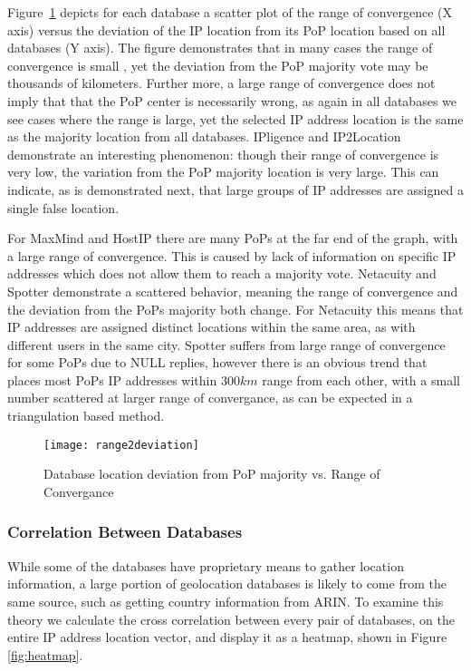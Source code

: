 Figure~\ref{fig:range2deviation} depicts for each database a scatter
plot of the range of convergence (X axis) versus the deviation of
the IP location from its PoP location based on all databases (Y
axis). The figure demonstrates that in many cases the range of
convergence is small , yet the deviation from the PoP majority vote
may be thousands of kilometers. Further more, a large range of
convergence does not imply that that the PoP center is necessarily
wrong, as again in all databases we see cases where the range is
large, yet the selected IP address location is the same as the
majority location from all databases. IPligence and IP2Location
demonstrate an interesting phenomenon: though their range of
convergence is very low, the variation from the PoP majority
location is very large. This can indicate, as is demonstrated next,
that large groups of IP addresses are assigned a single false
location.


For MaxMind and HostIP there are many PoPs at the far end of the
graph, with a large range of convergence. This is caused by lack of
information on specific IP addresses which does not allow them to
reach a majority vote. Netacuity and Spotter demonstrate a scattered
behavior, meaning the range of convergence and the deviation from
the PoPs majority both change. For Netacuity this means that IP
addresses are assigned distinct locations within the same area, as
with different users in the same city. Spotter suffers from large
range of convergence for some PoPs due to NULL replies, however
there is an obvious trend that places most PoPs IP addresses within
$300km$ range from each other, with a small number scattered at
larger range of convergance, as can be expected in a triangulation
based method.

\begin{figure}
\begin{minipage}[b]{\linewidth}
\centering
\texttt{[image: range2deviation]}
\caption{Database location deviation from PoP majority vs. Range of
Convergance} \label{fig:range2deviation}
\end{minipage}
\end{figure}

\subsubsection{Correlation Between Databases}

While some of the databases have proprietary means to gather
location information, a large portion of geolocation databases is
likely to come from the same source, such as getting country
information from ARIN. To examine this theory we calculate the cross
correlation between every pair of databases, on the entire IP
address location vector, and display it as a heatmap, shown in
Figure \ref{fig:heatmap}.

